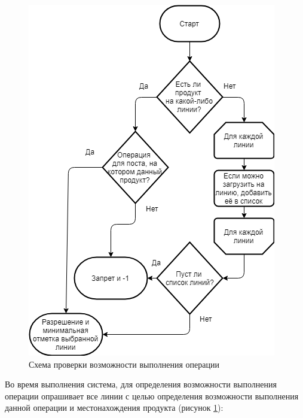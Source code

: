 \begin{figure}[ht]
	\centering
	\includegraphics[width=0.7\linewidth]{pics/assemblyConstrain.png}
	\caption{Схема проверки возможности выполнения операции}
	\label{fig:constrain}
\end{figure}

\indent Во время выполнения система, для определения возможности выполнения операции опрашивает все линии с целью определения возможности выполнения данной операции и местонахождения продукта (рисунок \ref{fig:constrain}):

